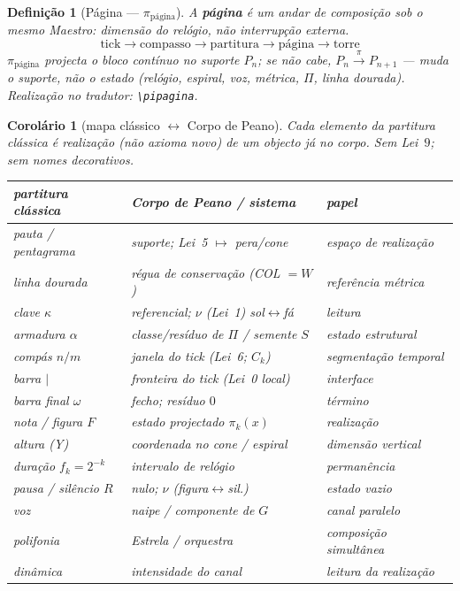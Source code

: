 \documentclass[11pt,a4paper]{article}
\newtheorem{definicao}{Definição}
\newtheorem{corolario}{Corolário}
\newcommand{\code}[1]{\texttt{#1}}
\begin{document}
\begin{definicao}[Página --- $\pi_{\mathrm{página}}$]\label{def:pi-pagina}
A \textbf{página} é um andar de composição sob o mesmo Maestro: dimensão
do relógio, não interrupção externa.
\[
\boxed{
\mathrm{tick}
\to
\mathrm{compasso}
\to
\mathrm{partitura}
\to
\mathrm{página}
\to
\mathrm{torre}
}
\]
$\pi_{\mathrm{página}}$ projecta o bloco contínuo no suporte $P_n$; se não
cabe, $P_n\xrightarrow{\pi}P_{n+1}$ --- muda o suporte, não o estado
(relógio, espiral, voz, métrica, $\Pi$, linha dourada). Realização no
tradutor: \code{\textbackslash pipagina}.
\end{definicao}

\begin{corolario}[mapa clássico $\leftrightarrow$ Corpo de Peano]
\label{cor:mapa-classico}
Cada elemento da partitura clássica é realização (não axioma novo) de um
objecto já no corpo. Sem Lei~$9$; sem nomes decorativos.
\begin{center}\small
\begin{tabular}{@{}lll@{}}
partitura clássica & Corpo de Peano / sistema & papel \\
\hline
pauta / pentagrama & suporte; Lei~5 $\mapsto$ pera/cone & espaço de realização \\
linha dourada & régua de conservação (COL $=W$) & referência métrica \\
clave $\kappa$ & referencial; $\nu$ (Lei~1) sol$\leftrightarrow$fá & leitura \\
armadura $\alpha$ & classe/resíduo de $\Pi$ / semente $S$ & estado estrutural \\
compás $n/m$ & janela do tick (Lei~6; $C_k$) & segmentação temporal \\
barra $|$ & fronteira do tick (Lei~0 local) & interface \\
barra final $\omega$ & fecho; resíduo $0$ & término \\
nota / figura $F$ & estado projectado $\pi_k(x)$ & realização \\
altura (Y) & coordenada no cone / espiral & dimensão vertical \\
duração $f_k=2^{-k}$ & intervalo de relógio & permanência \\
pausa / silêncio $R$ & nulo; $\nu$ (figura$\leftrightarrow$sil.) & estado vazio \\
voz & naipe / componente de $G$ & canal paralelo \\
polifonia & Estrela / orquestra & composição simultânea \\
dinâmica & intensidade do canal & leitura da realização \\

\end{tabular}
\end{center}
\end{corolario}
\end{document}
